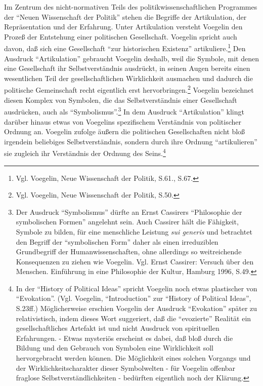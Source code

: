 Im Zentrum des nicht-normativen Teils des politikwissenschaftlichen
Programmes der "`Neuen Wissenschaft der Politik"' stehen die Begriffe
der Artikulation, der Repräsentation und der Erfahrung. Unter
Artikulation versteht Voegelin den Prozeß der Entstehung einer
politischen Gesellschaft. Voegelin spricht auch davon, daß sich eine
Gesellschaft "`zur historischen Existenz"' artikuliere.\footnote{Vgl.
  Voegelin, Neue Wissenschaft der Politik, S.61., S.67.} Den Ausdruck
"`Artikulation"' gebraucht Voegelin deshalb, weil die Symbole, mit denen
eine Gesellschaft ihr Selbstverständnis ausdrückt, in seinen Augen
bereits einen wesentlichen Teil der gesellschaftlichen Wirklichkeit
ausmachen und dadurch die politische Gemeinschaft recht eigentlich erst
hervorbringen.\footnote{Vgl. Voegelin, Neue Wissenschaft der Politik,
  S.50.}  Voegelin bezeichnet diesen Komplex von Symbolen, die das
Selbstverständnis einer Gesellschaft ausdrücken, auch als
"`Symbolismus"'.\footnote{Der Ausdruck "`Symbolismus"' dürfte an Ernst
  Cassirers "`Philosophie der symbolischen Formen"' angelehnt sein. Auch
  Cassirer hält die Fähigkeit, Symbole zu bilden, für eine menschliche
  Leistung {\it sui generis} und betrachtet den Begriff der
  "`symbolischen Form"' daher als einen irreduziblen Grundbegriff der
  Humanwissenschaften, ohne allerdings so weitreichende Konsequenzen zu
  ziehen wie Voegelin.  Vgl. Ernst Cassirer: Versuch über den Menschen.
  Einführung in eine Philosophie der Kultur, Hamburg 1996, S.49.} In dem
Ausdruck "`Artikulation"' klingt darüber hinaus etwas von Voegelins
spezifischem Verständnis von politischer Ordnung an. Voegelin zufolge
äußern die politischen Gesellschaften nicht bloß irgendein beliebiges
Selbstverständnis, sondern durch ihre Ordnung "`artikulieren"' sie
zugleich ihr Verständnis der Ordnung des Seins.\footnote{In der
  "`History of Political Ideas"' spricht Voegelin noch etwas plastischer
  von "`Evokation"'.  (Vgl.  Voegelin, "`Introduction"' zur "`History of
  Political Ideas"', S.23ff.)  Möglicherweise erschien Voegelin der
  Ausdruck "`Evokation"' später zu relativistisch, indem dieses Wort
  suggeriert, daß die "`evozierte"' Realität ein gesellschaftliches
  Artefakt ist und nicht Ausdruck von spirituellen Erfahrungen.  - Etwas
  mysteriös erscheint es dabei, daß bloß durch die Bildung und den
  Gebrauch von Symbolen eine Wirklichkeit soll hervorgebracht werden
  können.  Die Möglichkeit eines solchen Vorgangs und der
  Wirklichkeitscharakter dieser Symbolwelten - für Voegelin offenbar
  fraglose Selbstverständlichkeiten - bedürften eigentlich noch der
  Klärung.}

